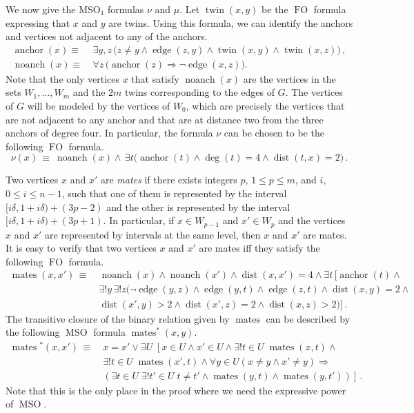 \documentclass{CSML}
\def\prebox#1{\mathop{\mbox{#1}}}
\newcommand{\FO}{\ensuremath{\operatorname{FO}}\xspace}
\newcommand{\MSO}{\ensuremath{\operatorname{MSO}}\xspace}
\newcommand{\MSOi}{\ensuremath{\operatorname{MSO_1}}\xspace}
\theoremstyle{plain}\newtheorem{claim}[thm]{Claim}
\begin{document}
We now give the \MSOi formulas $\nu$ and $\mu$.
Let $\prebox{twin}(x,y)$ be the \FO formula expressing that $x$ and $y$ are twins.
Using this formula, we can identify the anchors and vertices not adjacent to any of the anchors.
\begin{align*}
\prebox{anchor}(x)\equiv\>&
 \exists y,z\, \big(z\not=y\wedge\prebox{edge}(z,y)\wedge 
	\prebox{twin}(x,y)\wedge\prebox{twin}(x,z)\big)
\,,\\
\prebox{noanch}(x)\equiv\>&
 \forall z\, \big(\prebox{anchor}(z)\Rightarrow \neg\prebox{edge}(x,z)\big).
\end{align*}
Note that the only vertices $x$ that satisfy $\prebox{noanch}(x)$ are 
the vertices in the sets $W_1,\ldots,W_m$ and the $2m$ twins corresponding to the edges of $G$.
The vertices of $G$ will be modeled by the vertices of $W_0$,
which are precisely the vertices that are not adjacent to any anchor and
that are at distance two from the three anchors of degree four.
In particular, the formula $\nu$ can be chosen to be the following \FO formula.
$$
\nu(x)\,\equiv\> \prebox{noanch}(x)\wedge\, \exists t
	\big( \prebox{anchor}(t)\wedge \prebox{deg}(t)=4\wedge 
		\prebox{dist}(t,x)=2 \big)
\,.$$

Two vertices $x$ and $x'$ are {\em mates}
if there exists integers $p$, $1\le p\le m$, and $i$, $0\le i\le n-1$, such that
one of them is represented by the interval $[i\delta,1+i\delta)+(3p-2)$ and
the other is represented by the interval $[i\delta,1+i\delta)+(3p+1)$.
In particular, if $x\in W_{p-1}$ and $x'\in W_p$ and the vertices $x$ and $x'$ are represented by intervals at the same level,
then $x$ and $x'$ are mates.
It is easy to verify that two vertices $x$ and $x'$ are mates iff they satisfy the following \FO formula.
\begin{align*}
\prebox{mates}(x,x')\,\equiv~&
 \prebox{noanch}(x)\wedge\prebox{noanch}(x')\wedge\prebox{dist}(x,x')=4\wedge
	\exists t\,\big[\prebox{anchor}(t)\wedge 
\\
	&\exists!y\,\exists!z
	 \big( \neg\prebox{edge}(y,z)\wedge\prebox{edge}(y,t)
		\wedge\prebox{edge}(z,t) \wedge \prebox{dist}(x,y)=2\wedge
\\
	&\prebox{dist}(x',y)>2\wedge
	   \prebox{dist}(x',z)=2\wedge\prebox{dist}(x,z)>2
	\big)\big]\,.
\end{align*}
The transitive closure of the binary relation given by $\prebox{mates}$ can be described
by the following \MSO formula $\prebox{mates}^*(x,y)$.
\begin{align*}
\prebox{mates}{}^*(x,x')\,\equiv~&
   x=x'\vee \exists U\; \left[x\in U\wedge x'\in U\wedge \exists! t\in U\;\prebox{mates}(x,t)\wedge\right. \\
   &\exists! t\in U\;\prebox{mates}(x',t)\wedge \forall y\in U (x\not=y\wedge x'\not=y)\Rightarrow \\
   & \left.(\exists t\in U\; \exists! t'\in U\; t\not=t'\wedge \prebox{mates}(y,t)\wedge\prebox{mates} (y,t')) \right]\,.
\end{align*}
Note that this is the only place in the proof where we need the expressive power of \MSO.
\end{document}
